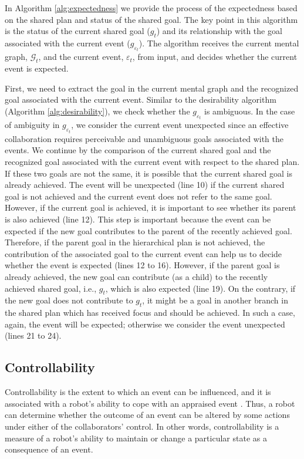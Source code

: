 \documentclass{aamas2016}
\begin{document}
In Algorithm \ref{alg:expectedness} we provide the process of the expectedness
based on the shared plan and status of the shared goal. The key point in this
algorithm is the status of the current shared goal ($\mathit{g}_{t}$) and its
relationship with the goal associated with the current event 
($\mathit{g}_{\varepsilon_t}$).  The algorithm receives the current mental
graph, $\mathcal{G}_{t}$, and the current event, $\varepsilon_t$, from input,
and decides whether the current event is expected. 

First, we need to extract the goal in the current mental graph and the
recognized goal associated with the current event. Similar to the desirability
algorithm (Algorithm \ref{alg:desirability}), we check whether the
$\mathit{g}_{\varepsilon_t}$ is ambiguous. In the case of ambiguity in
$\mathit{g}_{\varepsilon_t}$, we consider the current event unexpected since an
effective collaboration requires perceivable and unambiguous goals associated
with the events. We continue by the comparison of the current shared goal and
the recognized goal associated with the current event with respect to the shared
plan. If these two goals are not the same, it is possible that the current
shared goal is already achieved. The event will be unexpected (line 10) if the
current shared goal is not achieved and the current event does not refer to the
same goal. However, if the current goal is achieved, it is important to see
whether its parent is also achieved (line 12). This step is important because
the event can be expected if the new goal contributes to the parent of the
recently achieved goal. Therefore, if the parent goal in the hierarchical plan
is not achieved, the contribution of the associated goal to the current event
can help us to decide whether the event is expected (lines 12 to 16). However,
if the parent goal is already achieved, the new goal can contribute (as a child)
to the recently achieved shared goal, i.e., $\mathit{g}_{t}$, which is also
expected (line 19). On the contrary, if the new goal does not contribute to
$\mathit{g}_{t}$, it might be a goal in another branch in the shared plan which
has received focus and should be achieved. In such a case, again, the event will
be expected; otherwise we consider the event unexpected (lines 21 to 24).

\subsection{Controllability}

Controllability is the extent to which an event can be influenced, and it is
associated with a robot's ability to cope with an appraised event
\cite{gratch:domain-independent}. Thus, a robot can determine whether the
outcome of an event can be altered by some actions under either of the
collaborators' control. In other words, controllability is a measure of a
robot's ability to maintain or change a particular state as a consequence of an
event.
\end{document}
